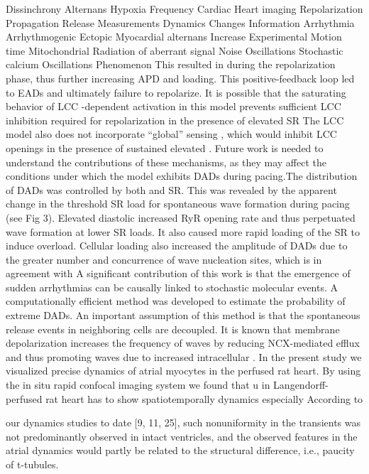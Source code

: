 \documentclass{biophys-new}
\begin{document}
Dissinchrony
Alternans
Hypoxia
Frequency
Cardiac
Heart imaging
Repolarization
Propagation
Release
Measurements
Dynamics
Changes
Information
Arrhythmia
Arrhythmogenic
Ectopic
Myocardial alternans
Increase
Experimental
Motion time
Mitochondrial
Radiation of aberrant signal
Noise
Oscillations
Stochastic calcium Oscillations
Phenomenon
This resulted in
 during the repolarization phase,
thus further increasing APD and  loading. This positive-feedback loop led to EADs and
ultimately failure to repolarize. It is possible that the saturating behavior of LCC -dependent activation in this model prevents sufficient LCC inhibition required for repolarization in
the presence of elevated SR 
The LCC model also does not incorporate “global” 
sensing , which would inhibit LCC openings in the presence of sustained elevated .
Future work is needed to understand the contributions of these mechanisms, as they may
affect the conditions under which the model exhibits DADs during pacing.The distribution of DADs was controlled by both  and SR. This was revealed
by the apparent change in the threshold SR  load for spontaneous  wave formation
during pacing (see Fig 3). Elevated diastolic  increased RyR opening rate and thus perpetuated  wave formation at lower SR  loads. It also caused more rapid loading of the
SR to induce overload. Cellular  loading also increased the amplitude of DADs due to the
greater number and concurrence of  wave nucleation sites, which is in agreement with
A significant contribution of this work is that the emergence of sudden arrhythmias can be
causally linked to stochastic molecular events. A computationally efficient method was developed to estimate the probability of extreme DADs. An important assumption of this method is
that the spontaneous  release events in neighboring cells are decoupled. It is known that
membrane depolarization increases the frequency of  waves by reducing NCX-mediated
 efflux and thus promoting  waves due to increased intracellular  \cite{walker2017estimating}.
In the present study we visualized precise  dynamics of atrial myocytes in the perfused rat heart.
By
using the in situ rapid confocal imaging system
we found that
u in
Langendorff-perfused rat heart has to show
spatiotemporally
 dynamics
especially
According to

\iffalse
our  dynamics studies to date [9, 11, 25], such nonuniformity
in the  transients was not predominantly
observed in intact ventricles, and the observed features in
the atrial  dynamics would partly be related to the
structural difference, i.e., paucity of t-tubules.
\end{document}
